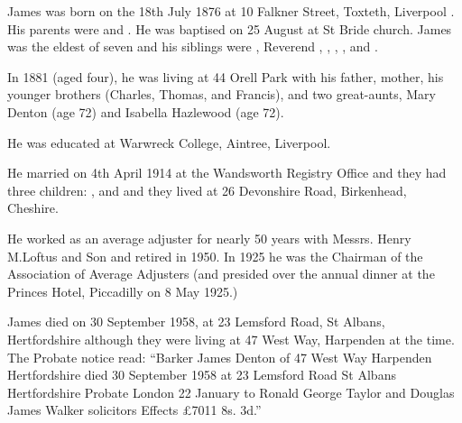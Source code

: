 
James was born on the 18th July 1876 at 10 Falkner Street, Toxteth, Liverpool \cite{JamesDBarkerBirth}. His parents were  and . He was baptised on 25 August at St Bride church.\cite{JamesDentonBarkerBaptism} James was the eldest of seven and his siblings were , Reverend , , , , and .

In 1881 (aged four), he was living at 44 Orell Park with his father, mother, his younger brothers (Charles, Thomas, and Francis), and two great-aunts, Mary Denton (age 72) and Isabella Hazlewood (age 72).\cite{UKCensusRG11_3688}

He was educated at Warwreck College, Aintree, Liverpool.

He married  on 4th April 1914 at the Wandsworth Registry Office \cite{JamesDBarkerMarriage} and they had three children: ,  and  and they lived at 26 Devonshire Road, Birkenhead, Cheshire.

He worked as an average adjuster for nearly 50 years with Messrs. Henry M.Loftus and Son and retired in 1950. In 1925 he was the Chairman of the Association of Average Adjusters (and presided over the annual dinner at the Princes Hotel, Piccadilly on 8 May 1925.)

James died on 30 September 1958, at 23 Lemsford Road, St Albans, Hertfordshire \cite{JamesDBarkerDeath} although they were living at 47 West Way, Harpenden at the time. The Probate notice read: ``Barker James Denton of 47 West Way Harpenden Hertfordshire died 30 September 1958 at 23 Lemsford Road St Albans Hertfordshire Probate London 22 January to Ronald George Taylor and Douglas James Walker solicitors Effects £7011 8s. 3d.''
